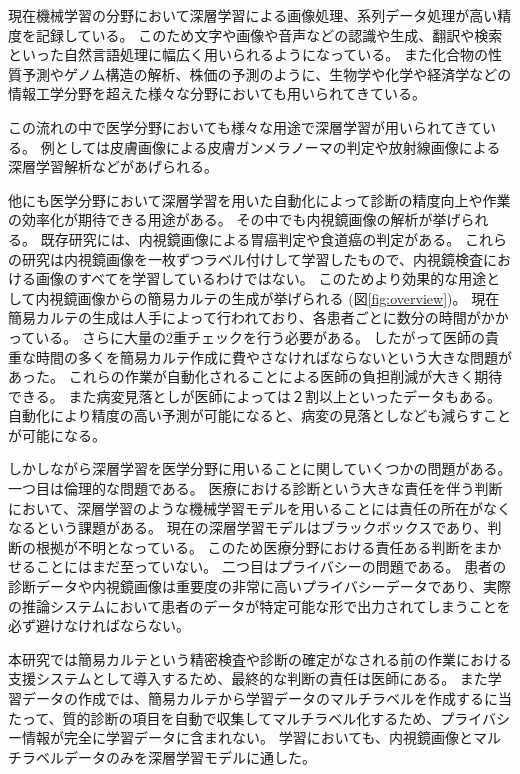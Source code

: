 現在機械学習の分野において深層学習による画像処理\cite{CNN,AlexNet,VGG,ResNet}、系列データ処理\cite{RNN,GRU,LSTM,Transformer}が高い精度を記録している。
このため文字や画像や音声などの認識\cite{DL_LVCSR,ImageNet}や生成\cite{GAN,VAE}、翻訳\cite{Transformer,Seq2Seq,effective_attention}や検索\cite{anxious_learning}といった自然言語処理に幅広く用いられるようになっている。
また化合物の性質予測\cite{Chemistry1,Chemistry2}やゲノム構造の解析\cite{Genomics}、株価の予測\cite{stock_prediction}のように、生物学や化学や経済学などの情報工学分野を超えた様々な分野においても用いられてきている。

この流れの中で医学分野においても様々な用途で深層学習が用いられてきている。
例としては皮膚画像による皮膚ガンメラノーマの判定\cite{skin_cancer_melanoma}や放射線画像による深層学習解析\cite{radiology}などがあげられる。

他にも医学分野において深層学習を用いた自動化によって診断の精度向上や作業の効率化が期待できる用途がある。
その中でも内視鏡画像の解析が挙げられる。
既存研究には、内視鏡画像による胃癌判定\cite{stomach_cancer}や食道癌\cite{esophageal_cancer}の判定がある。
これらの研究は内視鏡画像を一枚ずつラベル付けして学習したもので、内視鏡検査における画像のすべてを学習しているわけではない。
このためより効果的な用途として内視鏡画像からの簡易カルテの生成が挙げられる (図\ref{fig:overview})。
現在簡易カルテの生成は人手によって行われており、各患者ごとに数分の時間がかかっている。
さらに大量の2重チェックを行う必要がある。
したがって医師の貴重な時間の多くを簡易カルテ作成に費やさなければならないという大きな問題があった。
これらの作業が自動化されることによる医師の負担削減が大きく期待できる。
また病変見落としが医師によっては２割以上といったデータ\cite{medical_problem2}もある。
自動化により精度の高い予測が可能になると、病変の見落としなども減らすことが可能になる。

しかしながら深層学習を医学分野に用いることに関していくつかの問題がある。
一つ目は倫理的な問題である。
医療における診断という大きな責任を伴う判断において、深層学習のような機械学習モデルを用いることには責任の所在がなくなるという課題がある。
現在の深層学習モデルはブラックボックスであり、判断の根拠が不明となっている。
このため医療分野における責任ある判断をまかせることにはまだ至っていない。
二つ目はプライバシーの問題である。
患者の診断データや内視鏡画像は重要度の非常に高いプライバシーデータであり、実際の推論システムにおいて患者のデータが特定可能な形で出力されてしまうことを必ず避けなければならない。

本研究では簡易カルテという精密検査や診断の確定がなされる前の作業における支援システムとして導入するため、最終的な判断の責任は医師にある。
また学習データの作成では、簡易カルテから学習データのマルチラベルを作成するに当たって、質的診断の項目を自動で収集してマルチラベル化するため、プライバシー情報が完全に学習データに含まれない。
学習においても、内視鏡画像とマルチラベルデータのみを深層学習モデルに通した。

